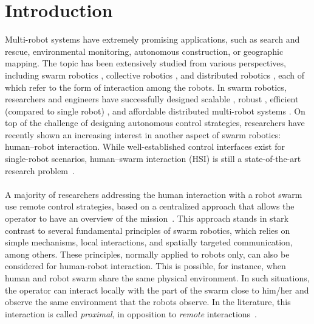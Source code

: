 \documentclass[smallextended]{svjour3}
\begin{document}
\section{Introduction}
\label{sec:introduction}
Multi-robot systems have extremely promising applications, such as search and rescue, environmental monitoring, autonomous construction, or geographic mapping. 
The topic has been extensively studied from various perspectives, including swarm robotics \cite{brambilla2013}, collective robotics \cite{kernbach2013handbook}, and distributed robotics \cite{martinoli2012distributed}, each of which refer to the form of interaction among the robots. 
In swarm robotics, researchers and engineers have successfully designed scalable \cite{rubenstein2012kilobot}, robust \cite{winfield2006safety}, efficient (compared to single robot) \cite{Bonani2012}, and affordable distributed multi-robot systems \cite{rubenstein2014programmable}. 
On top of the challenge of designing autonomous control strategies, researchers have recently shown an increasing interest in another aspect of swarm robotics: human--robot interaction. 
While well-established control interfaces exist for single-robot scenarios, human--swarm interaction (HSI) is still a state-of-the-art research problem~\cite{Kolling2016}. \\
\\
A majority of researchers addressing the human interaction with a robot swarm use remote control strategies, based on a centralized approach that allows the operator to have an overview of the mission~\cite{Kolling2016}. 
This approach stands in stark contrast to several fundamental principles of swarm robotics, which relies on simple mechanisms, local interactions, and spatially targeted communication, among others. 
These principles, normally applied to robots only, can also be considered for human-robot interaction.
This is possible, for instance, when human and robot swarm share the same physical environment. 
In such situations, the operator can interact locally with the part of the swarm close to him/her and observe the same environment that the robots observe. 
In the literature, this interaction is called \textit{proximal}, in opposition to \textit{remote} interactions~\cite{Kolling2016}.\\
\\
\end{document}
